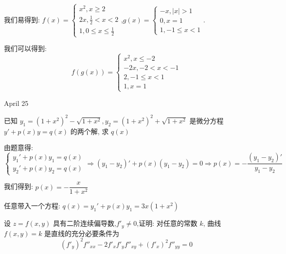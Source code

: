 \begin{solution}
	
	我们易得到: $f(x)=\left\lbrace 
	\begin{array}{l}
		x^2,x\geq 2\\
		2x,\frac{1}{2}<x< 2\\
		1,0\leq x\leq \frac{1}{2}
	\end{array}
	\right. $,\quad $g(x)=\left\lbrace 
	\begin{array}{l}
		-x,|x|> 1\\
		0,x=1\\
		1,-1\leq x<1
	\end{array}
	\right. $.
	
	我们可以得到: 
	$$f(g(x))=\left\lbrace 
	\begin{array}{l}
		x^2,x\leq -2\\
		-2x,-2<x<-1\\
		2,-1\leq x<1\\
		1,x=1	
	\end{array}
	\right. $$
\end{solution}


\textcolor{purplea}{April 25}

\begin{example}[][Exam: 30.4.7]
	已知 $y_{1}=(1+x^2)^2-\sqrt{1+x^2}, y_{2}=(1+x^2)^2+\sqrt{1+x^2}$ 是微分方程 $y'+ p(x)y = q(x)$ 的两个解, 求 $q(x)$
\end{example}

\begin{solution}
	
	由题意得: 
	$$\left\lbrace 
	\begin{array}{l}
		y_{1}'+p(x)y_{1}=q(x)\\
		y_{2}'+p(x)y_{2}=q(x)
	\end{array}
	\right. \Rightarrow (y_{1}-y_{2})'+p(x)(y_{1}-y_{2})=0\Rightarrow p(x)=-\dfrac{(y_{1}-y_{2})'}{y_{1}-y_{2}}$$
	
	我们得到: $p(x)=-\dfrac{x}{1+x^2}$
	
	任意带入一个方程: $q(x)=y_{1}'+p(x)y_{1}=3x(1+x^2)$
\end{solution}

\begin{example}[][Exam: 30.4.8]
	设 $z=f(x,y)$ 具有二阶连续偏导数,$f'_{y}\neq 0$,证明: 对任意的常数 $k$, 曲线 $f(x,y)=k$ 是直线的充分必要条件为 
	$$(f'_{y})^2f''_{xx}-2f'_{x}f'_{y}f''_{xy}+(f'_{x})^2f''_{yy}=0$$
\end{example}

